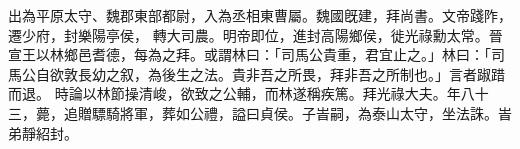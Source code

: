 \begin{pinyinscope}
 
出為平原太守、魏郡東部都尉，入為丞相東曹屬。魏國旣建，拜尚書。文帝踐阼，遷少府，封樂陽亭侯，
 轉大司農。明帝即位，進封高陽鄉侯，徙光祿勳太常。晉宣王以林鄉邑耆德，每為之拜。或謂林曰：「司馬公貴重，君宜止之。」林曰：「司馬公自欲敦長幼之叙，為後生之法。貴非吾之所畏，拜非吾之所制也。」言者踧踖而退。
 時論以林節操清峻，欲致之公輔，而林遂稱疾篤。拜光祿大夫。年八十三，薨，追贈驃騎將軍，葬如公禮，謚曰貞侯。子峕嗣，為泰山太守，坐法誅。峕弟靜紹封。

\end{pinyinscope}

